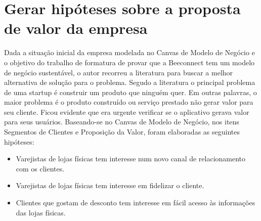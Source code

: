 \section{Gerar hipóteses sobre a proposta de valor da empresa}
\label{cha:gerar_hipoteses}
Dada a situação inicial da empresa modelada no Canvas de Modelo de Negócio e o objetivo do trabalho de formatura de provar que a Beeconnect tem um modelo de negócio sustentável, o autor recorreu a literatura para buscar a melhor alternativa de solução para o problema. 
Segudo a literatura o principal problema de uma startup é construir um produto que ninguém quer. Em outras palavras, o maior problema é o produto construído ou serviço prestado não gerar valor para seu cliente.
Ficou evidente que era urgente verificar se o aplicativo gerava valor para seus usuários. Baseando-se no Canvas de Modelo de Negócio, nos itens Segmentos de Clientes e Proposição da Valor, foram elaboradas as seguintes hipóteses:
\begin{itemize}
\item Varejistas de lojas físicas tem interesse num novo canal de relacionamento com os clientes.
\item Varejistas de lojas físicas tem interesse em fidelizar o cliente.
\item Clientes que gostam de desconto tem interesse em fácil acesso às informações das lojas físicas.
\end{itemize}